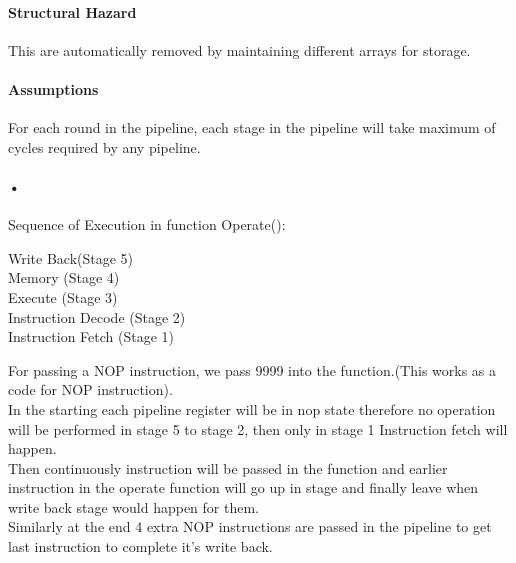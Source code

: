 \documentclass[12pt]{extarticle}
\begin{document}
\paragraph{Structural Hazard}
This are automatically removed by maintaining different arrays for storage.
\paragraph{Assumptions}
For each round in the pipeline, each stage in the pipeline will take maximum of cycles required by any pipeline.
\paragraph{•}
Sequence of Execution in function Operate():\\
\begin{center}
Write Back(Stage 5) \\ Memory (Stage 4) \\ Execute (Stage 3) \\ Instruction Decode (Stage 2) \\ Instruction Fetch (Stage 1)\\
\end{center}
For passing a NOP instruction, we pass 9999 into the function.(This works as a code for NOP instruction).\\
In the starting each pipeline register will be in nop state therefore no operation will be performed in stage 5 to stage 2, then only in stage 1 Instruction fetch will happen.\\
Then continuously instruction will be passed in the function and earlier instruction in the operate function will go up in stage and finally leave when write back stage would happen for them.\\
Similarly at the end 4 extra NOP instructions are passed in the pipeline to get last instruction to complete it's write back. 
\end{document}
